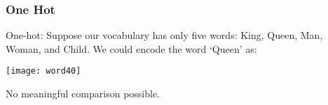 \begin{frame}[fragile]\frametitle{One Hot}
One-hot:  Suppose our vocabulary has only five words: King, Queen, Man, Woman, and Child. We could encode the word `Queen' as:
\begin{center}
\texttt{[image: word40]}
\end{center}
No meaningful comparison possible.
\end{frame}







